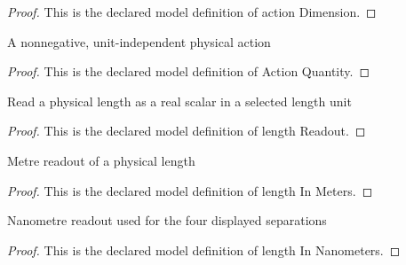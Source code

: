 \begin{proof}
  This is the declared model definition of action Dimension.
\end{proof}
\begin{definition}
  \label{def:physics:phyx-mini-0623:phyxminiproblems-problemphyxmini0623-actionquantity}
  A nonnegative, unit-independent physical action
\end{definition}
\begin{proof}
  This is the declared model definition of Action Quantity.
\end{proof}
\begin{definition}
  \label{def:physics:phyx-mini-0623:phyxminiproblems-problemphyxmini0623-lengthreadout}
  Read a physical length as a real scalar in a selected length unit
\end{definition}
\begin{proof}
  This is the declared model definition of length Readout.
\end{proof}
\begin{definition}
  \label{def:physics:phyx-mini-0623:phyxminiproblems-problemphyxmini0623-lengthinmeters}
  Metre readout of a physical length
\end{definition}
\begin{proof}
  This is the declared model definition of length In Meters.
\end{proof}
\begin{definition}
  \label{def:physics:phyx-mini-0623:phyxminiproblems-problemphyxmini0623-lengthinnanometers}
  Nanometre readout used for the four displayed separations
\end{definition}
\begin{proof}
  This is the declared model definition of length In Nanometers.
\end{proof}
